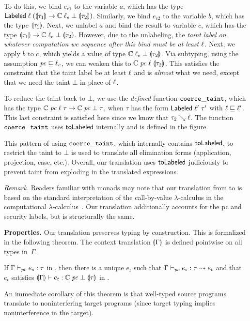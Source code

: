 To do this, we bind $e_{c1}$ to the variable $a$, which has the type
$\mathsf{Labeled}\;\ell\;(\llparenthesis \tau_1 \rrparenthesis \to
  \mathbb{C}\;\ell_e\;\bot\;\llparenthesis \tau_2 \rrparenthesis)$. Similarly, we bind
$e_{c2}$ to the variable $b$, which has the type
$\llparenthesis \tau_1 \rrparenthesis$. Next, we unlabel $a$ and bind the result to
variable $c$, which has the type $\llparenthesis \tau_1 \rrparenthesis \to
\mathbb{C}\;\ell_e\;\bot\;\llparenthesis \tau_2 \rrparenthesis$. However, due to the
unlabeling, the \emph{taint label on whatever computation we sequence
  after this bind must be at least $\ell$}. Next, we apply $b$ to
$c$, which yields a value of type
$\mathbb{C}\;\ell_e\;\bot\;\llparenthesis \tau_2 \rrparenthesis$. Via subtyping, using the
assumption $\mathit{pc} \sqsubseteq \ell_e$, we can weaken this to
$\mathbb{C}\;\mathit{pc}\;\ell\;\llparenthesis \tau_2 \rrparenthesis$. This satisfies the
constraint that the taint label be at least $\ell$ and is
\emph{almost} what we need, except that we need the taint $\bot$ in
place of $\ell$.

To reduce the taint back to $\bot$, we use the \emph{defined} {\cg}
function $\mathtt{coerce\_taint}$, which has the type $\mathbb{C}\;\mathit{pc}\;\ell\;\tau \to
\mathbb{C}\;\mathit{pc}\;\bot\;\tau$, when $\tau$ has the form
$\mathsf{Labeled}\;\ell'\;\tau'$ with $\ell \sqsubseteq \ell'$. This
last constraint is satisfied here since we know that $\tau_2 \searrow
\ell$. The function $\mathtt{coerce\_taint}$ uses $\mathsf{toLabeled}$ internally and is
defined in the figure.

This pattern of using $\mathtt{coerce\_taint}$, which internally contains
$\mathsf{toLabeled}$, to restrict the taint to $\bot$ is used to translate
all elimination forms (application, projection, case, etc.). Overall,
our translation uses $\mathsf{toLabeled}$ judiciously to prevent taint from
exploding in the translated expressions.

\textit{Remark.} Readers familiar with monads may note that our
translation from {\fg} to {\cg} is based on the standard
interpretation of the call-by-value $\lambda$-calculus in the
computational $\lambda$-calculus~\cite{moggi91:notions}. Our
translation additionally accounts for the pc and security labels, but
is structurally the same.



\medskip\noindent \textbf{Properties.}  Our translation preserves
typing by construction. This is formalized in the following
theorem. The context translation $\llparenthesis \Gamma \rrparenthesis$ is defined
pointwise on all types in~$\Gamma$.
%
\begin{thm}\label{thm:fg-2-cg-typePres}
  If $\Gamma \vdash_{\mathit{pc}} e_s: \tau$ in {\fg}, then there is a unique
  $e_t$ such that $\Gamma \vdash_{\mathit{pc}} e_s: \tau \leadsto e_t$ and that
  $e_t$ satisfies $\llparenthesis \Gamma \rrparenthesis \vdash e_t:
  \mathbb{C}\;\mathit{pc}\;\bot\;\llparenthesis \tau \rrparenthesis$ in {\cg}.
\end{thm}
An immediate corollary of this theorem is that well-typed source
programs translate to noninterfering target programs (since target
typing implies noninterference in the target).

